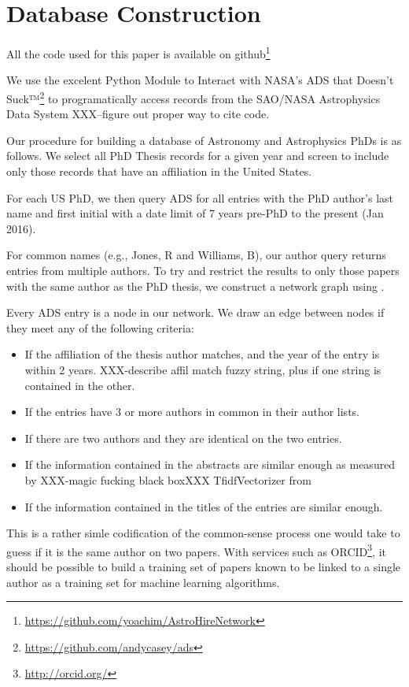 \documentclass{emulateapj}
\begin{document}
\section{Database Construction}

All the code used for this paper is available on github\footnote{\url{https://github.com/yoachim/AstroHireNetwork}}

We use the excelent Python Module to Interact with NASA's ADS that Doesn't Suck™\footnote{\url{https://github.com/andycasey/ads}} to programatically access records from the SAO/NASA Astrophysics Data System XXX--figure out proper way to cite code. 

Our procedure for building a database of Astronomy and Astrophysics PhDs is as follows.  We select all PhD Thesis records for a given year and screen to include only those records that have an affiliation in the United States.

For each US PhD, we then query ADS for all entries with the PhD author's last name and first initial with a date limit of 7 years pre-PhD to the present (Jan 2016).

For common names (e.g., Jones, R and Williams, B), our author query returns entries from multiple authors.  To try and restrict the results to only those papers with the same author as the PhD thesis, we construct a network graph using \citet{networkx}.

Every ADS entry is a node in our network. We draw an edge between nodes if they meet any of the following criteria:
\begin{itemize}
\item{If the affiliation of the thesis author matches, and the year of the entry is within 2 years. XXX-describe affil match fuzzy string, plus if one string is contained in the other.}
\item{If the entries have 3 or more authors in common in their author lists.}
\item{If there are two authors and they are identical on the two entries.}
\item{If the information contained in the abstracts are similar enough as measured by XXX-magic fucking black boxXXX TfidfVectorizer from \citet{scikit-learn}}
  \item{If the information contained in the titles of the entries are similar enough.}
\end{itemize}

This is a rather simle codification of the common-sense process one would take to guess if it is the same author on two papers. With services such as ORCID\footnote{\url{http://orcid.org/}}, it should be possible to build a training set of papers known to be linked to a single author as a training set for machine learning algorithms.  
\end{document}
